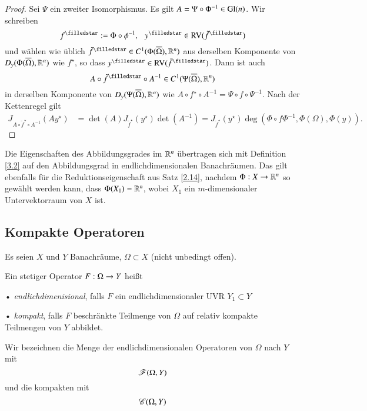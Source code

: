 \begin{proof}
    Sei $\Psi$ ein zweiter Isomorphismus. Es gilt $A=\Psi\circ\Phi^{-1}\in \mathrm{Gl}(n)$. Wir schreiben
    \[
        f^\star:=\Phi \circ \phi^{-1}, \qq y^\star\in \RV(\tilde f^\star)
    \]
    und wählen wie üblich $\tilde f^\star\in C^1(\Phi(\ol\Omega),\R^n)$ aus derselben Komponente von
    $D_y(\Phi(\overline \Omega),\mathbb{R}^n)$ wie $f^\star$, so dass $y^\star\in \RV(\tilde f^\star)$. Dann ist auch
    \[
        A\circ \tilde f^\star \circ A^{-1}\in C^1(\Psi (\ol \Omega),\R^n)
    \]
    in derselben Komponente von $D_y(\Psi(\overline \Omega),\mathbb{R}^n)$ wie $A\circ f^\star\circ A^{-1}=\Psi\circ
    f\circ \Psi^{-1}$.
    Nach der Kettenregel gilt
    \begin{align*}
        J_{A\circ \tilde f^\star\circ A^{-1}}(Ay^\star)&= \det(A) J_{\tilde f^\star}(y^\star)
        \det(A^{-1})=J_{\tilde f^\star} (y^\star) \deg(\Phi\circ f \Phi^{-1},\Phi(\Omega), \Phi (y)).
    \end{align*}
    \[ \]
\end{proof}

Die Eigenschaften des Abbildungsgrades im $\mathbb{R}^n$ übertragen sich mit Definition \ref{3.2} auf den
Abbildungsgrad in endlichdimensionalen Banachräumen. Das gilt ebenfalls für die Reduktionseigenschaft aus
Satz \ref{2.14}, nachdem $\Phi:X\rightarrow\mathbb{R}^n$ so gewählt werden kann, dass $\Phi(X_1)=\mathbb{R}^n$, wobei $X_1$ ein
$m$-dimensionaler Untervektorraum von $X$ ist.

\subsection{Kompakte Operatoren}

Es seien $X$ und $Y$ Banachräume, $\Omega\subset X$ (nicht unbedingt offen).

\begin{defi}
    Ein stetiger Operator $F:\Omega\rightarrow Y$ heißt
    \begin{description}
        \item{•} \textit{endlichdimenisional}, falls $F$ ein endlichdimensionaler UVR $Y_1\subset Y$
        \item{•} \textit{kompakt}, falls $F$ beschränkte Teilmenge von $\Omega$ auf relativ kompakte
        Teilmengen von $Y$ abbildet.
    \end{description}
    Wir bezeichnen die Menge der endlichdimensionalen Operatoren von $\Omega$ nach $Y$ mit
    \[
        \mathscr F(\Omega,Y)
    \]
    und die kompakten mit
    \[
        \mathscr C(\Omega,Y)
    \]
\end{defi}

